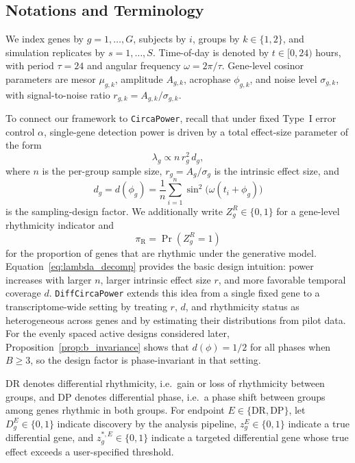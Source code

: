\documentclass{article}
\newcommand{\software}[1]{\texttt{#1}}
\begin{document}
\subsection{Notations and Terminology}
\label{sec:notation}

We index genes by $g=1,\ldots,G$, subjects by $i$, groups by
$k\in\{1,2\}$, and simulation replicates by $s=1,\ldots,S$. Time-of-day is
denoted by $t\in[0,24)$ hours, with period $\tau=24$ and angular frequency
$\omega=2\pi/\tau$. Gene-level cosinor parameters are mesor $\mu_{g,k}$,
amplitude $A_{g,k}$, acrophase $\phi_{g,k}$, and noise level $\sigma_{g,k}$,
with signal-to-noise ratio $r_{g,k}=A_{g,k}/\sigma_{g,k}$.

To connect our framework to \software{CircaPower}, recall that under fixed
Type~I error control $\alpha$, single-gene detection power is driven by a
total effect-size parameter of the form
\begin{equation}
\lambda_g \propto n\,r_g^2\,d_g,
\label{eq:lambda_decomp}
\end{equation}
where $n$ is the per-group sample size, $r_g=A_g/\sigma_g$ is the intrinsic
effect size, and
\begin{equation}
d_g=d(\phi_g)=\frac{1}{n}\sum_{i=1}^n \sin^2\!\bigl(\omega(t_i+\phi_g)\bigr)
\label{eq:design_factor_circapower}
\end{equation}
is the sampling-design factor. We additionally write $Z_g^R\in\{0,1\}$ for a
gene-level rhythmicity indicator and
\begin{equation}
\pi_{\mathrm{R}}=\Pr(Z_g^R=1)
\label{eq:pi_r}
\end{equation}
for the proportion of genes that are rhythmic under the generative model.
Equation~\eqref{eq:lambda_decomp} provides the basic design intuition: power
increases with larger $n$, larger intrinsic effect size $r$, and more
favorable temporal coverage $d$. \software{DiffCircaPower} extends this idea
from a single fixed gene to a transcriptome-wide setting by treating $r$, $d$,
and rhythmicity status as heterogeneous across genes and by estimating their
distributions from pilot data. For the evenly spaced active designs considered
later, Proposition~\ref{prop:b_invariance} shows that $d(\phi)=1/2$ for all
phases when $B\geq 3$, so the design factor is phase-invariant in that setting.

DR denotes differential rhythmicity, i.e.\ gain or loss of rhythmicity between
groups, and DP denotes differential phase, i.e.\ a phase shift between groups
among genes rhythmic in both groups. For endpoint $E\in\{\mathrm{DR},
\mathrm{DP}\}$, let $D_g^E\in\{0,1\}$ indicate discovery by the analysis
pipeline, $z_g^E\in\{0,1\}$ indicate a true differential gene, and
$z_g^{*,E}\in\{0,1\}$ indicate a targeted differential gene whose true effect
exceeds a user-specified threshold.
\end{document}
